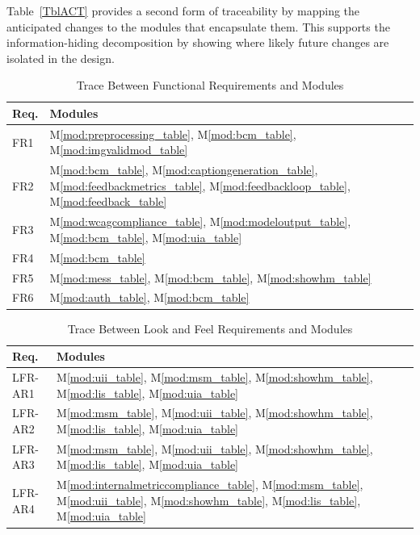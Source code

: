 \documentclass[12pt, titlepage]{article}
\newcommand{\mref}[1]{M\ref{#1}}
\begin{document}
Table~\ref{TblACT} provides a second form of traceability by mapping the
anticipated changes to the modules that encapsulate them. This supports the
information-hiding decomposition by showing where likely future changes are
isolated in the design.

\begin{table}[H]
  \caption{Trace Between Functional Requirements and Modules}
  \label{TblFRT}
  \centering
  \small
  \begin{tabularx}{\textwidth}{>{\RaggedRight\arraybackslash}p{}Y}
    \toprule
    \textbf{Req.} & \textbf{Modules}\\
    \midrule
    FR1 & \mref{mod:preprocessing_table},  \mref{mod:bcm_table},
    \mref{mod:imgvalidmod_table}\\
    FR2 & \mref{mod:bcm_table}, \mref{mod:captiongeneration_table},
    \mref{mod:feedbackmetrics_table}, \mref{mod:feedbackloop_table},
    \mref{mod:feedback_table}\\
    FR3 & \mref{mod:wcagcompliance_table},
    \mref{mod:modeloutput_table}, \mref{mod:bcm_table}, \mref{mod:uia_table}\\
    FR4 & \mref{mod:bcm_table}\\
    FR5 &  \mref{mod:mess_table}, \mref{mod:bcm_table},
    \mref{mod:showhm_table}\\
    FR6 &  \mref{mod:auth_table}, \mref{mod:bcm_table}\\
    \bottomrule
  \end{tabularx}
\end{table}

\begin{table}[H]
  \caption{Trace Between Look and Feel Requirements and Modules}
  \label{TblLFRT}
  \centering
  \small
  \begin{tabularx}{\textwidth}{>{\RaggedRight\arraybackslash}p{}Y}
    \toprule
    \textbf{Req.} & \textbf{Modules}\\
    \midrule
    LFR-AR1 & \mref{mod:uii_table}, \mref{mod:msm_table},
    \mref{mod:showhm_table}, \mref{mod:lis_table}, \mref{mod:uia_table}\\
    LFR-AR2 & \mref{mod:msm_table}, \mref{mod:uii_table},
    \mref{mod:showhm_table}, \mref{mod:lis_table}, \mref{mod:uia_table}\\
    LFR-AR3 & \mref{mod:msm_table}, \mref{mod:uii_table},
    \mref{mod:showhm_table}, \mref{mod:lis_table}, \mref{mod:uia_table}\\
    LFR-AR4 & \mref{mod:internalmetriccompliance_table},
    \mref{mod:msm_table}, \mref{mod:uii_table},
    \mref{mod:showhm_table}, \mref{mod:lis_table}, \mref{mod:uia_table}\\
    \bottomrule
  \end{tabularx}
\end{table}
\end{document}
